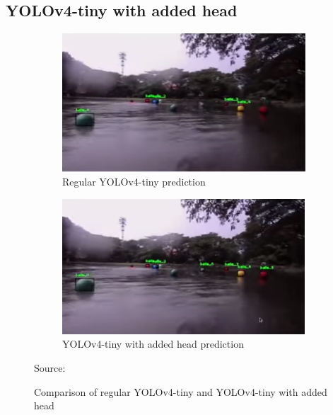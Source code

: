   \subsection{YOLOv4-tiny with added head}%
  \begin{figure}[H]
    \hfill%
    \begin{subfigure}[c][][c]{.45\textwidth}
        \includegraphics[width=1\linewidth]{figures/yolov4barun-regular.png}
        \caption{Regular YOLOv4-tiny prediction}
        \label{fig:barun-yolov4}
    \end{subfigure}\hfill  
    \begin{subfigure}[c][][c]{.45\textwidth}
        \includegraphics[width=1\linewidth]{figures/yolov4barun-addhead.png}
        \caption{YOLOv4-tiny with added head prediction}
        \label{fig:barun-yolov4-3l}
    \end{subfigure}\hfill%
    \caption*{Source: \textcite{barunastra}}
    \caption{Comparison of regular YOLOv4-tiny and YOLOv4-tiny with added head}
    \label{fig:barun}
  \end{figure}

